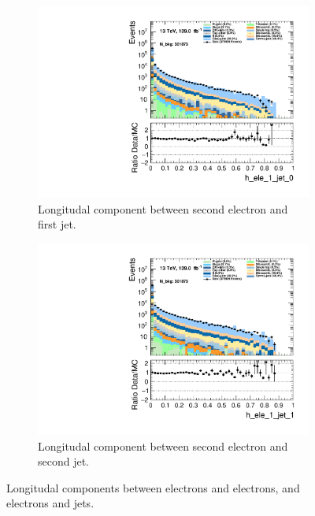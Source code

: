 \begin{figure}
\begin{subfigure}{.49\textwidth}
        \includegraphics[width=\textwidth]{Figures/MC_Data_comp/h_ele_1_jet_0.pdf}
        \caption{Longitudal component between second electron and first jet.}
        \label{fig:h_ele_1_jet_0}
    \end{subfigure}
    \hfill
    \begin{subfigure}{.49\textwidth}
        \includegraphics[width=\textwidth]{Figures/MC_Data_comp/h_ele_1_jet_1.pdf}
        \caption{Longitudal component between second electron and second jet. }
        \label{fig:h_ele_1_jet_1}
    \end{subfigure}
    \hfill       
    \caption{Longitudal components between electrons and electrons, and electrons and jets.}
    \label{fig:batch4_feats}
\end{figure}

